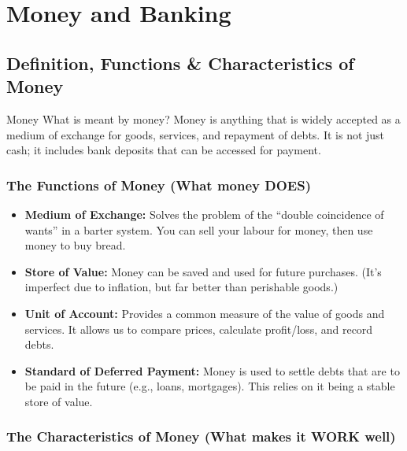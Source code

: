 \documentclass[11pt, a4paper, twoside]{book}
\begin{document}
\section{Money and Banking}

\subsection{Definition, Functions \& Characteristics of Money}

\begin{keyterm}{Money}
What is meant by money? Money is anything that is widely accepted as a medium of exchange for goods, services, and repayment of debts. It is not just cash; it includes bank deposits that can be accessed for payment.
\end{keyterm}

\subsubsection{The Functions of Money (What money DOES)}

\begin{itemize}
  \item \textbf{Medium of Exchange:} Solves the problem of the ``double coincidence of wants'' in a barter system. You can sell your labour for money, then use money to buy bread.
  \item \textbf{Store of Value:} Money can be saved and used for future purchases. (It's imperfect due to inflation, but far better than perishable goods.)
  \item \textbf{Unit of Account:} Provides a common measure of the value of goods and services. It allows us to compare prices, calculate profit/loss, and record debts.
  \item \textbf{Standard of Deferred Payment:} Money is used to settle debts that are to be paid in the future (e.g., loans, mortgages). This relies on it being a stable store of value.
\end{itemize}

\subsubsection{The Characteristics of Money (What makes it WORK well)}
\end{document}
